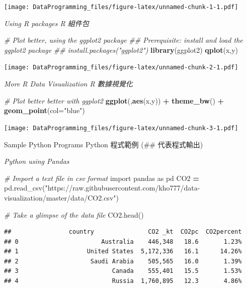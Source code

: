 \documentclass[]{book}
\newenvironment{Shaded}{\begin{snugshade}}{\end{snugshade}}
\newcommand{\CommentTok}[1]{\textcolor[rgb]{0.56,0.35,0.01}{\textit{#1}}}
\newcommand{\DataTypeTok}[1]{\textcolor[rgb]{0.13,0.29,0.53}{#1}}
\newcommand{\ImportTok}[1]{#1}
\newcommand{\KeywordTok}[1]{\textcolor[rgb]{0.13,0.29,0.53}{\textbf{#1}}}
\newcommand{\NormalTok}[1]{#1}
\newcommand{\OperatorTok}[1]{\textcolor[rgb]{0.81,0.36,0.00}{\textbf{#1}}}
\newcommand{\StringTok}[1]{\textcolor[rgb]{0.31,0.60,0.02}{#1}}
\begin{document}
\texttt{[image: DataProgramming\_files/figure-latex/unnamed-chunk-1-1.pdf]}

\emph{Using R packages R 組件包}

\begin{Shaded}
\begin{Highlighting}[]
\CommentTok{# Plot better, using the ggplot2 package }
\CommentTok{## Prerequisite: install and load the ggplot2 package}
\CommentTok{## install.packages("ggplot2")}
\KeywordTok{library}\NormalTok{(ggplot2)}
\KeywordTok{qplot}\NormalTok{(x,y)}
\end{Highlighting}
\end{Shaded}

\texttt{[image: DataProgramming\_files/figure-latex/unnamed-chunk-2-1.pdf]}

\emph{More R Data Visualization R 數據視覺化}

\begin{Shaded}
\begin{Highlighting}[]
\CommentTok{# Plot better better with ggplot2}
\KeywordTok{ggplot}\NormalTok{(,}\KeywordTok{aes}\NormalTok{(x,y)) }\OperatorTok{+}\StringTok{ }\KeywordTok{theme_bw}\NormalTok{() }\OperatorTok{+}\StringTok{ }\KeywordTok{geom_point}\NormalTok{(}\DataTypeTok{col=}\StringTok{"blue"}\NormalTok{)}
\end{Highlighting}
\end{Shaded}

\texttt{[image: DataProgramming\_files/figure-latex/unnamed-chunk-3-1.pdf]}

Sample Python Programs Python 程式範例 (\#\# 代表程式輸出)

\emph{Python using Pandas}

\begin{Shaded}
\begin{Highlighting}[]

\CommentTok{# Import a text file in csv format}
\ImportTok{import}\NormalTok{ pandas }\ImportTok{as}\NormalTok{ pd}
\NormalTok{CO2 }\OperatorTok{=}\NormalTok{ pd.read_csv(}\StringTok{"https://raw.githubusercontent.com/kho777/data-visualization/master/data/CO2.csv"}\NormalTok{)}

\CommentTok{# Take a glimpse of the data file}
\NormalTok{CO2.head()}
\end{Highlighting}
\end{Shaded}

\begin{verbatim}
##                country               CO2 _kt  CO2pc  CO2percent
## 0                       Australia    446,348   18.6       1.23%
## 1                   United States  5,172,336   16.1      14.26%
## 2                    Saudi Arabia    505,565   16.0       1.39%
## 3                          Canada    555,401   15.5       1.53%
## 4                          Russia  1,760,895   12.3       4.86%
\end{verbatim}
\end{document}
